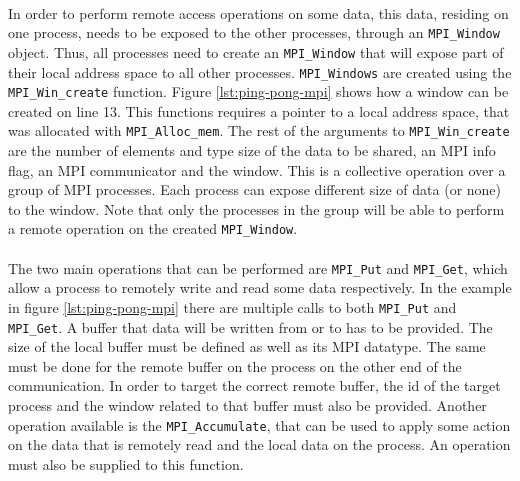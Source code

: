 \paragraph{}
In order to perform remote access operations on some data, this data, residing on one process, needs to be exposed to 
the other processes, through an \texttt{MPI\_Window} object.
Thus, all processes need to create an \texttt{MPI\_Window} that will expose
part of their local address space to all other processes.  
\texttt{MPI\_Windows} are created using the \texttt{MPI\_Win\_create} function.
Figure \ref{lst:ping-pong-mpi} shows how a window can be created on line 13. 
This functions requires a pointer to a local address space, that was allocated with \texttt{MPI\_Alloc\_mem}.
The rest of the arguments to \texttt{MPI\_Win\_create} are the number of elements and type size of the data to be shared,
an MPI info flag, an MPI communicator and the window. 
This is a collective operation over a group of MPI processes.  Each process can expose different size of data (or none)
to the window. Note that only the processes in the group will be able
to perform a remote operation on the created \texttt{MPI\_Window}.

\paragraph{}
The two main operations that can be performed are \texttt{MPI\_Put} and \texttt{MPI\_Get}, 
which allow a process to remotely write and read some data respectively.  In the example in figure \ref{lst:ping-pong-mpi}
there are multiple calls to both \texttt{MPI\_Put} and \texttt{MPI\_Get}. A buffer that data will be written from or to
has to be provided.  The size of the local buffer must be defined as well as its MPI datatype.  The same must be done
for the remote buffer on the process on the other end of the communication.  In order to target the correct remote buffer,
the id of the target process and the window related to that buffer must also be provided.
Another operation available is the \texttt{MPI\_Accumulate}, that can be used to apply some action on the data 
that is remotely read and the local data on the process.  An operation must also be supplied to this function.    

